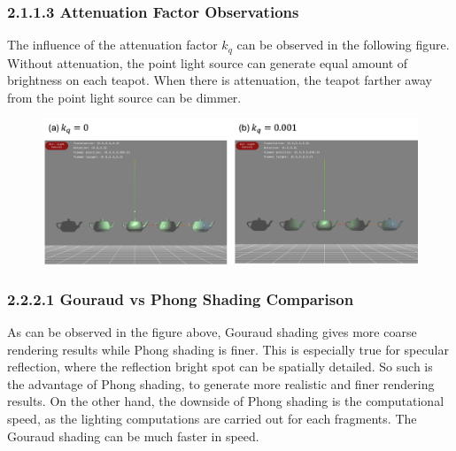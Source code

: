 \documentclass[11pt]{article}
\begin{document}
\subsubsection*{2.1.1.3 Attenuation Factor Observations}
The influence of the attenuation factor $k_q$ can be observed in the following figure. Without attenuation, the point light source can generate equal amount of brightness on each teapot. When there is attenuation, the teapot farther away from the point light source can be dimmer. 
\begin{figure}[h!t]
    \includegraphics[width=\textwidth]{figures/2p1p1p3.png}
\end{figure}

\subsubsection*{2.2.2.1 Gouraud vs Phong Shading Comparison}
As can be observed in the figure above, Gouraud shading gives more coarse rendering results while Phong shading is finer. This is especially true for specular reflection, where the reflection bright spot can be spatially detailed. So such is the advantage of Phong shading, to generate more realistic and finer rendering results. On the other hand, the downside of Phong shading is the computational speed, as the lighting computations are carried out for each fragments. The Gouraud shading can be much faster in speed.  
\end{document}
